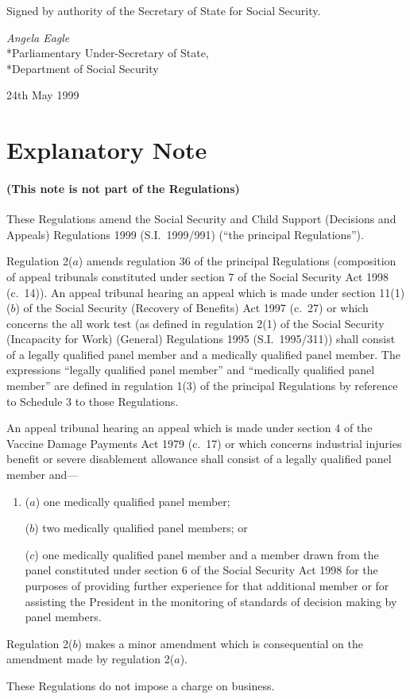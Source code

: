 \documentclass[12pt,a4paper]{article}
\begin{document}
\bigskip

Signed 
by authority of the Secretary of State for Social Security.

{\raggedleft
\emph{Angela Eagle
}\\*Parliamentary Under-Secretary of State,\\*Department of Social Security

}

24th May 1999

\small

\part{Explanatory Note}

\renewcommand\parthead{--- Explanatory Note}

\subsection*{(This note is not part of the Regulations)}

These Regulations amend the Social Security and Child Support (Decisions and Appeals) Regulations 1999 (S.I.\ 1999/991) (“the principal Regulations”).

Regulation 2($a$) amends regulation 36 of the principal Regulations (composition of appeal tribunals constituted under section 7 of the Social Security Act 1998 (c.\ 14)). An appeal tribunal hearing an appeal which is made under section 11(1)($b$) of the Social Security (Recovery of Benefits) Act 1997 (c.\ 27) or which concerns the all work test (as defined in regulation 2(1) of the Social Security (Incapacity for Work) (General) Regulations 1995 (S.I.\ 1995/311)) shall consist of a legally qualified panel member and a medically qualified panel member. The expressions “legally qualified panel member” and “medically qualified panel member” are defined in regulation 1(3) of the principal Regulations by reference to Schedule 3 to those Regulations.

An appeal tribunal hearing an appeal which is made under section 4 of the Vaccine Damage Payments Act 1979 (c.\ 17) or which concerns industrial injuries benefit or severe disablement allowance shall consist of a legally qualified panel member and—
\begin{enumerate}\item[]
($a$) one medically qualified panel member;

($b$) two medically qualified panel members; or

($c$) one medically qualified panel member and a member drawn from the panel constituted under section 6 of the Social Security Act 1998 for the purposes of providing further experience for that additional member or for assisting the President in the monitoring of standards of decision making by panel members.
\end{enumerate}

Regulation 2($b$) makes a minor amendment which is consequential on the amendment made by regulation 2($a$).

These Regulations do not impose a charge on business. 
\end{document}
